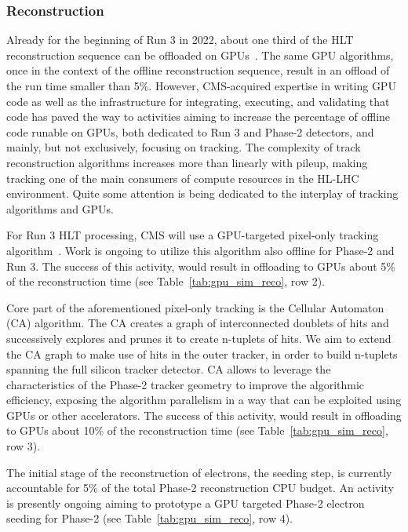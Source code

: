 \documentclass{cmspaper}
\begin{document}
\subsubsection{Reconstruction}
Already for the beginning of Run 3 in 2022, about one third of the HLT reconstruction sequence can be offloaded on GPUs~\cite{CMS-TDR-21-007}. The same GPU algorithms, once in the context of the offline reconstruction sequence, result in an offload of the run time smaller than 5\%. However, CMS-acquired expertise in writing GPU code as well as the infrastructure for integrating, executing, and validating that code has paved the way to activities aiming to increase the percentage of offline code runable on GPUs, both dedicated to Run 3 and Phase-2 detectors, and mainly, but not exclusively, focusing on tracking. The complexity of track reconstruction algorithms increases more than linearly with pileup, making tracking one of the main consumers of compute resources in the HL-LHC environment. Quite some attention is being dedicated to the interplay of tracking algorithms and GPUs.

For Run 3 HLT processing, CMS will use a GPU-targeted pixel-only tracking algorithm~\cite{Schulte:2668183}. Work is ongoing to utilize this algorithm also offline for Phase-2 and Run 3. The success of this activity, would result in offloading to GPUs about 5\% of the reconstruction time (see Table~\ref{tab:gpu_sim_reco}, row 2).

Core part of the aforementioned pixel-only tracking is the Cellular Automaton (CA) algorithm. The CA creates a graph of interconnected doublets of hits and successively explores and prunes it to create n-tuplets of hits. We aim to extend the CA graph to make use of hits in the outer tracker, in order to build n-tuplets spanning the full silicon tracker detector. CA allows to leverage the characteristics of the Phase-2 tracker geometry to improve the algorithmic efficiency, exposing the algorithm parallelism in a way that can be exploited using GPUs or other accelerators. The success of this activity, would result in offloading to GPUs about 10\% of the reconstruction time (see Table~\ref{tab:gpu_sim_reco}, row 3).

The initial stage of the reconstruction of electrons, the seeding step, is currently accountable for 5\% of the total Phase-2 reconstruction CPU budget. An activity is presently ongoing aiming to prototype a GPU targeted Phase-2 electron seeding for Phase-2 (see Table~\ref{tab:gpu_sim_reco}, row 4). 
\end{document}
